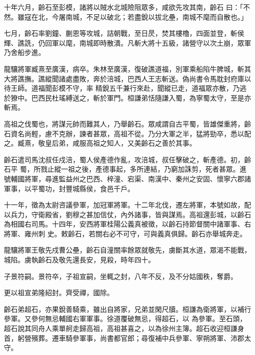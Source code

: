\begin{pinyinscope}
 十年六月，齡石至彭模，諸將以賊水北城險阻眾多，咸欲先攻其南，齡石
 曰：「不然。雖寇在北，今屠南城，不足以破北；若盡銳以拔北壘，南城不麾而自散也。」



 七月，齡石率劉鐘、蒯恩等攻城，詰朝戰，至日昃，焚其樓櫓，四面並登，斬侯輝、譙詵，仍回軍以麾，南城即時散潰。凡斬大將十五級，諸營守以次土崩，眾軍乃舍船步進。



 龍驤將軍臧熹至廣漢，病卒。朱林至廣漢，復破譙道福，別軍乘船陷牛脾城，斬其大將譙撫。譙縱聞諸處盡敗，奔於涪城，巴西人王志斬送。偽尚書令馬耽封府庫以待王師。道福聞彭模不守，率
 精銳五千兼行來赴，聞縱已走，道福眾亦散，乃逃於獠中。巴西民杜瑤縛送之，斬於軍門。桓謙弟恬隨謙入蜀，為寧蜀太守，至是亦斬焉。



 高祖之伐蜀也，將謀元帥而難其人，乃舉齡石。眾咸謂自古平蜀，皆雄傑重將，齡石資名尚輕，慮不克辦，諫者甚眾，高祖不從。乃分大軍之半，猛將勁卒，悉以配之。臧熹，敬皇后弟，咸服高祖之知人，又美齡石之善於其事。



 齡石遣司馬沈叔任戍涪，蜀人侯產德作亂，攻涪城，叔任擊破之，斬產德。初，齡石平
 蜀，所戮止縱一祖之後，產德事起，多所連結，乃窮加誅剪，死者甚眾。進號輔國將軍，尋進監益州之巴西、梓潼、宕渠、南漢中、秦州之安固、懷寧六郡諸軍事，以平蜀功，封豐城縣侯，食邑千戶。



 十一年，徵為太尉咨議參軍，加冠軍將軍。十二年北伐，遷左將軍，本號如故，配以兵力，守衛殿省，劉穆之甚加信仗，內外諸事，皆與謀焉。高祖還彭城，以齡石為相國右司馬。十四年，安西將軍桂陽公義真被徵，以齡石持節督關中諸軍事、右將軍、雍州刺
 史。敕齡石，若關右必不可守，可與義真俱歸。齡石亦舉城奔走。



 龍驤將軍王敬先戍曹公壘，齡石自潼關率餘眾就敬先，虜斷其水道，眾渴不能戰，城陷。虜執齡石及敬先還長安，見殺，時年四十。



 子景符嗣。景符卒，子祖宣嗣，坐輒之封，八年不反，及不分姑國秩，奪爵。



 更以祖宣弟隆紹封。齊受禪，國除。



 齡石弟超石，亦果銳善騎乘，雖出自將家，兄弟並閑尺牘。桓謙為衛將軍，以補行參軍。又參何無忌輔國右軍軍事。徐道覆破無忌，得超石，以
 為參軍。至石頭，超石說其同舟人乘單舸走歸高祖，高祖甚喜之，以為徐州主簿。超石收迎桓謙身首，躬營殯葬。遷車騎參軍事，尚書都官郎；尋復補中兵參軍、寧朔將軍、沛郡太守。




\end{pinyinscope}
